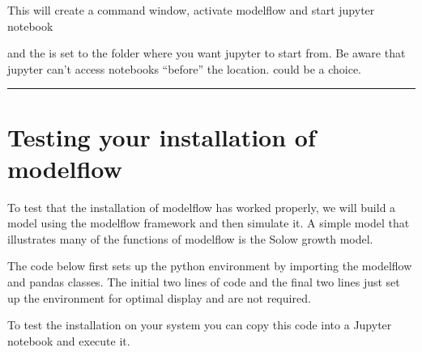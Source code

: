 \documentclass[letterpaper,10pt,english]{jupyterBook}
\begin{document}
\begin{sphinxVerbatim}[commandchars=\\\{\}]
\PYGZbs{}\PYGZbs{}  \PYGZbs{}\PYGZbs{}\PYGZbs{} \PYGZbs{}\PYGZbs{}\PYGZbs{} 
\end{sphinxVerbatim}

\sphinxAtStartPar
This will create a command window, activate modelflow and start jupyter notebook

\sphinxAtStartPar
and the   is set to the folder where you want jupyter to start from. 
Be aware that jupyter can’t access notebooks “before” the  location.  could be a choice.


\bigskip\hrule\bigskip


\sphinxstepscope


\chapter{Testing your installation of modelflow}
\label{\detokenize{content/03_Installation/TestingModelFlow:testing-your-installation-of-modelflow}}\label{\detokenize{content/03_Installation/TestingModelFlow::doc}}
\sphinxAtStartPar
To test that the installation of modelflow has worked properly, we will build a model using the modelflow framework and then simulate it.  A simple model that illustrates many of the functions of modelflow is the Solow growth model.

\sphinxAtStartPar
The code below first sets up the python environment by importing the modelflow  and pandas classes.  The initial two lines of code and the final two lines just set up the environment for optimal display and are not required.

\sphinxAtStartPar
To test the installation on your system you can copy this code into a Jupyter notebook and execute it.
\end{document}
